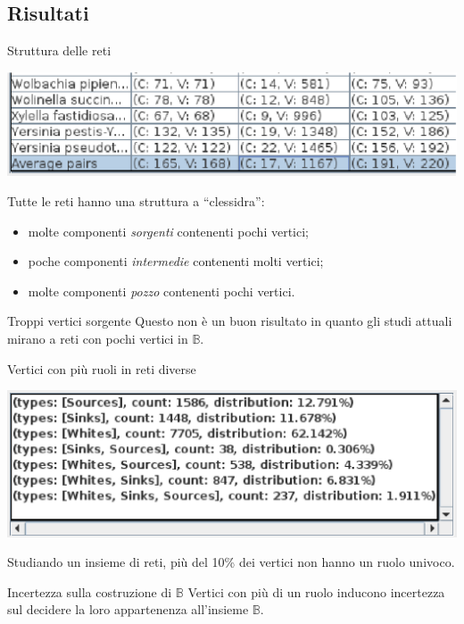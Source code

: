 \documentclass{beamer}
\begin{document}
\subsection{Risultati}

\begin{frame}{Struttura delle reti}
  \begin{center}
    \includegraphics[scale=.5]{images/ResultViewer-table-with-average-row-selected-particular.eps}
  \end{center}
Tutte le reti hanno una struttura a ``clessidra'':
\begin{itemize}
\item molte componenti \emph{sorgenti} contenenti pochi vertici;
\item poche componenti \emph{intermedie} contenenti molti vertici;
\item molte componenti \emph{pozzo} contenenti pochi vertici.
\end{itemize}
\pause
\begin{alertblock}{Troppi vertici sorgente}
  Questo non \`e un buon risultato in quanto gli studi attuali mirano
  a reti con pochi vertici in $\mathbb{B}$.
\end{alertblock}
\end{frame}

\begin{frame}{Vertici con pi\`u ruoli in reti diverse}
  \begin{center}
    \includegraphics[scale=.5]{images/ResultViewer-grouping-table-zoom}
  \end{center}
  Studiando un insieme di reti, pi\`u del 10\% dei vertici non hanno
  un ruolo univoco.
  \pause
  \begin{alertblock}{Incertezza sulla costruzione di $\mathbb{B}$}
    Vertici con pi\`u di un ruolo inducono incertezza sul decidere la
    loro appartenenza all'insieme $\mathbb{B}$.
  \end{alertblock}
\end{frame}
\end{document}
